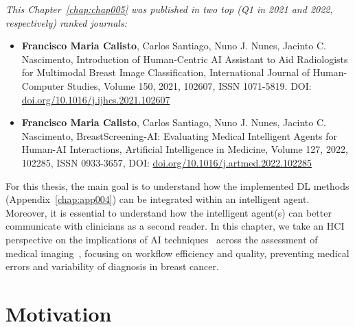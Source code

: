 \clearpage
\label{chap:chap005}

\vspace{0.05mm}

\noindent
{\it This Chapter~\ref{chap:chap005} was published in two top (Q1 in 2021 and 2022, respectively) ranked journals:}

\vspace{0.05mm}

\begin{itemize}
\item {\bf Francisco Maria Calisto}, Carlos Santiago, Nuno J. Nunes, Jacinto C. Nascimento, Introduction of Human-Centric AI Assistant to Aid Radiologists for Multimodal Breast Image Classification, International Journal of Human-Computer Studies, Volume 150, 2021, 102607, ISSN 1071-5819. DOI: \href{https://doi.org/10.1016/j.ijhcs.2021.102607}{doi.org/10.1016/j.ijhcs.2021.102607}
\item {\bf Francisco Maria Calisto}, Carlos Santiago, Nuno J. Nunes, Jacinto C. Nascimento, BreastScreening-AI: Evaluating Medical Intelligent Agents for Human-AI Interactions, Artificial Intelligence in Medicine, Volume 127, 2022, 102285, ISSN 0933-3657, DOI: \href{https://doi.org/10.1016/j.artmed.2022.102285}{doi.org/10.1016/j.artmed.2022.102285}
\end{itemize}

For this thesis, the main goal is to understand how the implemented \ac{DL} methods (Appendix~\ref{chap:app004}) can be integrated within an intelligent agent.
Moreover, it is essential to understand how the intelligent agent(s) can better communicate with clinicians as a second reader.
In this chapter, we take an \ac{HCI} perspective on the implications of \ac{AI} techniques~\cite{CALISTO2022102285} across the assessment of medical imaging~\cite{CALISTO2021102607}, focusing on workflow efficiency and quality, preventing medical errors and variability of diagnosis in breast cancer.

\section{Motivation}
\label{sec:chap005001}

